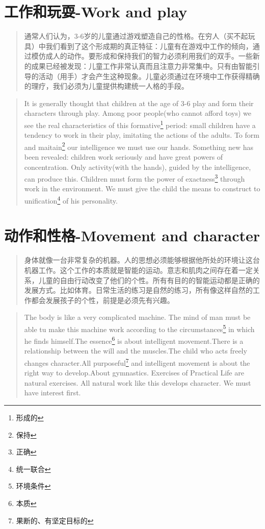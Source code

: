 \documentclass[lang=cn,10pt]{elegantbook}
\begin{document}
\chapter{工作和玩耍-Work and play}

\begin{quote}
{\small 通常人们认为，3-6岁的儿童通过游戏塑造自己的性格。在穷人（买不起玩具）中我们看到了这个形成期的真正特征：儿童有在游戏中工作的倾向，通过模仿成人的动作。要形成和保持我们的智力必须利用我们的双手。一些新的成果已经被发现：儿童工作非常认真而且注意力非常集中。只有由智能引导的活动（用手）才会产生这种现象。儿童必须通过在环境中工作获得精确的理疗，我们必须为儿童提供构建统一人格的手段。}
\end{quote}

\begin{tcolorbox}
\begin{quote}
{\small It is generally thought that children at the age of 3-6 play and form their characters through play. Among poor people(who cannot afford toys) we see the real characteristics of this formative\footnote{形成的} period: small children have a tendency to work in their play, imitating the actions of the adults. To form and maitain\footnote{保持} our intelligence we must use our hands. Something new has been revealed: children work seriously and have great powers of concentration. Only activity(with the hands), guided by the intelligence, can produce this. Children must form the power of exactness\footnote{正确} through work in the environment. We must give the child the means to construct to unification\footnote{统一联合} of his personality.}
\end{quote}
\end{tcolorbox}


\chapter{动作和性格-Movement and character}

\begin{quote}
  {\small 身体就像一台非常复杂的机器。人的思想必须能够根据他所处的环境让这台机器工作。这个工作的本质就是智能的运动。意志和肌肉之间存在着一定关系，儿童的自由行动改变了他们的个性。所有有目的的智能运动都是正确的发展方式。比如体育。日常生活的练习是自然的练习，所有像这样自然的工作都会发展孩子的个性，前提是必须先有兴趣。}
\end{quote}

\begin{tcolorbox}
\begin{quote}
  {\small The body is like a very complicated machine. The mind of man must be able tu make this machine work according to the circumstances\footnote{环境条件} in which he finds himself.The essence\footnote{本质} is about intelligent movement.There is a relationship between the will and the muscles.The child who acts freely changes character.All purposeful\footnote{果断的、有坚定目标的} and intelligent movement is about the right way to develop.About gymnastics. Exercises of Practical Life are natural exercises. All natural work like this develops character. We must have interest first.}
\end{quote}
\end{tcolorbox}
\end{document}
